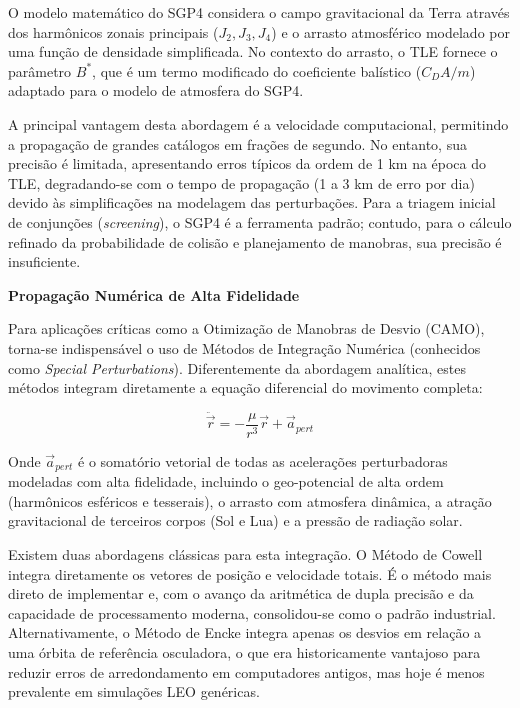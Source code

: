 O modelo matemático do SGP4 considera o campo gravitacional da Terra através dos harmônicos zonais principais ($J_2, J_3, J_4$) e o arrasto atmosférico modelado por uma função de densidade simplificada. No contexto do arrasto, o TLE fornece o parâmetro $B^*$, que é um termo modificado do coeficiente balístico ($C_D A/m$) adaptado para o modelo de atmosfera do SGP4.

A principal vantagem desta abordagem é a velocidade computacional, permitindo a propagação de grandes catálogos em frações de segundo. No entanto, sua precisão é limitada, apresentando erros típicos da ordem de 1 km na época do TLE, degradando-se com o tempo de propagação (1 a 3 km de erro por dia) devido às simplificações na modelagem das perturbações. Para a triagem inicial de conjunções (\textit{screening}), o SGP4 é a ferramenta padrão; contudo, para o cálculo refinado da probabilidade de colisão e planejamento de manobras, sua precisão é insuficiente.


\noindent \textbf{Propagação Numérica de Alta Fidelidade}

Para aplicações críticas como a Otimização de Manobras de Desvio (CAMO), torna-se indispensável o uso de Métodos de Integração Numérica (conhecidos como \textit{Special Perturbations}). Diferentemente da abordagem analítica, estes métodos integram diretamente a equação diferencial do movimento completa:

\begin{equation}
    \ddot{\vec{r}} = -\frac{\mu}{r^3}\vec{r} + \vec{a}_{pert}
\end{equation}

Onde $\vec{a}_{pert}$ é o somatório vetorial de todas as acelerações perturbadoras modeladas com alta fidelidade, incluindo o geo-potencial de alta ordem (harmônicos esféricos e tesserais), o arrasto com atmosfera dinâmica, a atração gravitacional de terceiros corpos (Sol e Lua) e a pressão de radiação solar.

Existem duas abordagens clássicas para esta integração. O Método de Cowell integra diretamente os vetores de posição e velocidade totais. É o método mais direto de implementar e, com o avanço da aritmética de dupla precisão e da capacidade de processamento moderna, consolidou-se como o padrão industrial. Alternativamente, o Método de Encke integra apenas os desvios em relação a uma órbita de referência osculadora, o que era historicamente vantajoso para reduzir erros de arredondamento em computadores antigos, mas hoje é menos prevalente em simulações LEO genéricas.

